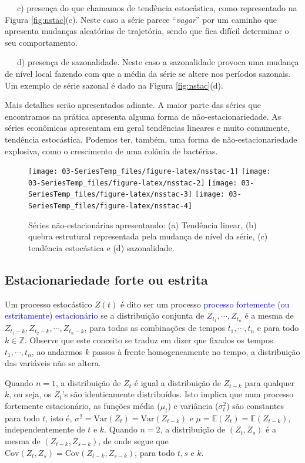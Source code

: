 \documentclass[
]{book}
\theoremstyle{definition}
\theoremstyle{definition}
\theoremstyle{definition}
\theoremstyle{remark}
\begin{document}
~~~c) presença do que chamamos de tendência estocástica, como representado na Figura \ref{fig:nstac}(c). Neste caso a série parece ``\emph{vagar}'' por um caminho que apresenta mudanças aleatórias de trajetória, sendo que fica difícil determinar o seu comportamento.

~~~d) presença de sazonalidade. Neste caso a sazonalidade provoca uma mudança de nível local fazendo com que a média da série se altere nos períodos sazonais. Um exemplo de série sazonal é dado na Figura \ref{fig:nstac}(d).

Mais detalhes serão apresentados adiante. A maior parte das séries que encontramos na prática apresenta alguma forma de não-estacionariedade. As séries econômicas apresentam em geral tendências lineares e muito comumente, tendência estocástica. Podemos ter, também, uma forma de não-estacionariedade explosiva, como o crescimento de uma colônia de bactérias.

\begin{figure}
\texttt{[image: 03-SeriesTemp\_files/figure-latex/nsstac-1]} \texttt{[image: 03-SeriesTemp\_files/figure-latex/nsstac-2]} \texttt{[image: 03-SeriesTemp\_files/figure-latex/nsstac-3]} \texttt{[image: 03-SeriesTemp\_files/figure-latex/nsstac-4]} \caption{ Séries não-estacionárias apresentando: (a) Tendência linear, (b) quebra estrutural representada pela mudança de nível da série, (c) tendência estocástica e (d) sazonalidade.}\label{fig:nsstac}
\end{figure}

\hypertarget{estacionariedade-forte-ou-estrita}{%
\subsection{Estacionariedade forte ou estrita}\label{estacionariedade-forte-ou-estrita}}

Um processo estocástico \(Z(t)\) é dito ser um processo \textcolor{blue}{processo fortemente (ou estritamente) estacionário} se a distribuição conjunta de \(Z_{t_1},\cdots, Z_{t_n}\) é a mesma de \(Z_{t_1 - k}, Z_{t_2-k},\cdots, Z_{t_n - k}\), para todas as combinações de tempos \(t_1, \cdots, t_n\) e para todo \(k\in\mathbb{Z}\). Observe que este conceito se traduz em dizer que fixados os tempos \(t_1, \cdots, t_n\), ao andarmos \(k\) passos à frente homogeneamente no tempo, a distribuição das variáveis não se altera.

Quando \(n = 1\), a distribuição de \(Z_t\) é igual a distribuição de \(Z_{t-k}\) para qualquer \(k\), ou seja, os \(Z_t\)'s são identicamente distribuídos. Isto implica que num processo fortemente estacionário, as funções média (\(\mu_t\)) e variância (\(\sigma^2_t\)) são constantes para todo \(t\), isto é,
\(\sigma^2=\mbox{Var}(Z_t) = \mbox{Var}(Z_{t-k})\) e \(\mu=\mathbb{E} (Z_t ) = \mathbb{E} (Z_{t-k} )\), independentemente de \(t\) e \(k\). Quando \(n = 2\), a distribuição de \((Z_t, Z_s)\) é a mesma de \((Z_{t-k}, Z_{s-k} )\), de onde segue que \(\mbox{Cov}(Z_t, Z_s ) = \mbox{Cov}(Z_{t-k}, Z_{s-k} )\), para todo \(t,s\) e \(k\).
\end{document}

